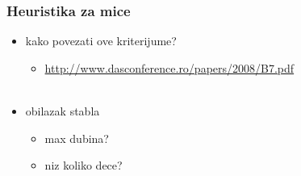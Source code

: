 \documentclass[compress,aspectratio=169]{beamer}
\begin{document}
\begin{frame}[fragile]
  \frametitle{Heuristika za mice}
  \begin{itemize}
    \item kako povezati ove kriterijume?
    \begin{itemize}
      \item \url{http://www.dasconference.ro/papers/2008/B7.pdf} \\ \ \\
    \end{itemize}
    \item obilazak stabla
    \begin{itemize}
      \item max dubina?
      \item niz koliko dece?
    \end{itemize}
  \end{itemize}
\end{frame}
\end{document}
